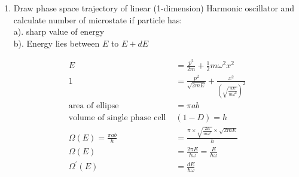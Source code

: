 \begin{enumerate}
\begin{tasks}(4)
	\task[\textbf{a.}]$E^{\left(\frac{3 N}{2}-1\right)} \delta E$
	\task[\textbf{b.}]$E^{\frac{N}{2}} \delta E$
	\task[\textbf{c.}]$N E^{\frac{1}{2}} \delta E$
	\task[\textbf{d.}]$N^{N} \delta E$ 
\end{tasks}
\begin{answer}
	\begin{align*}
	D(E) &\propto E^{(d / s-1)}\\
	\text { Here } d&=3 \mathrm{~N} \text { and } s=2 \text { (massive) }\\
	D(E) &\propto E^{\left(\frac{3 N}{2}-1\right)}
	\end{align*}
	So the correct answer is \textbf{Option (a)}
\end{answer}
\item 
Draw phase space trajectory of linear (1-dimension) Harmonic oscillator and calculate number of microstate if particle has:\\
a). sharp value of energy\\
b). Energy lies between $E$ to $E+d E$
\begin{answer}
	\begin{align*}
	E&=\frac{p^{2}}{2 m}+\frac{1}{2} m \omega^2 x^{2}\\
	1&=\frac{p^{2}}{\sqrt{2 m E}}+\frac{x^{2}}{\left(\sqrt{\frac{2 E}{m \omega^2}}\right)^{2}}\\
	\text{area of ellipse }&=\pi a b\\
	\text{volume of single phase cell }&(1-D)=h\\
	\Omega(E)=\frac{\pi a b}{h}&=\frac{\pi \times \sqrt{\frac{2 E}{m \omega^2}}  \times \sqrt{2 m E}}{h}\\
	\Omega(E)&=\frac{2 \pi E}{h \omega}=\frac{E}{h \omega}\\
	\Omega^{\prime}(E)&=\frac{d E}{\hbar \omega}
	\end{align*}
\end{answer}	
\end{enumerate}
